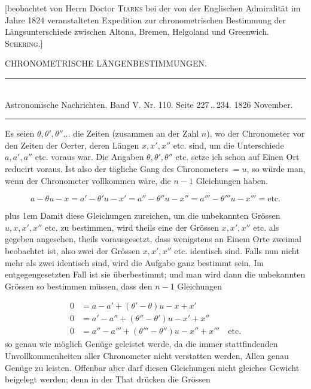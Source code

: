 \clearpage
{}
\hypertarget{native-460-chronometric}{}
\expandafter\def\csname HistoricalNoteText462\endcsname{[beobachtet von Herrn Doctor \textsc{Tiarks} bei der von der Englischen Admiralität im Jahre 1824
veranstalteten Expedition zur chronometrischen Bestimmung der Längsunterschiede zwischen Altona,
Bremen, Helgoland und Greenwich. \textsc{Schering}.]}
\begin{center}{\large CHRONOMETRISCHE LÄNGENBESTIMMUNGEN.}\end{center}

\begin{center}
\rule{0.55\linewidth}{0.4pt}\\[2pt]
Astronomische Nachrichten. Band V. Nr. 110. Seite 227\,..\,234. 1826 November.\\[2pt]
\rule{0.55\linewidth}{0.4pt}
\end{center}

Es seien $\theta, \theta', \theta''\ldots$ die Zeiten (zusammen an der Zahl $n$), wo der Chronometer
vor den Zeiten der Oerter, deren Längen $x, x', x''$ etc. sind, um die Unterschiede
$a, a', a''$ etc. voraus war. Die Angaben $\theta, \theta', \theta''$ etc. setze ich schon auf Einen Ort
reducirt voraus. Ist also der tägliche Gang des Chronometers $=u$, so würde man, wenn
der Chronometer vollkommen wäre, die $n-1$ Gleichungen haben.

\[
a-\theta u-x = a'-\theta' u-x' = a''-\theta'' u-x'' = a'''-\theta''' u-x''' = \text{etc.}
\]

\begingroup\rightskip=0pt plus 1em
Damit diese Gleichungen zureichen, um die unbekannten Grössen $u, x, x', x''$ etc. zu
bestimmen, wird theils eine der Grössen $x, x', x''$ etc. als gegeben angesehen, theils
vorausgesetzt, dass wenigstens an Einem Orte zweimal beobachtet ist, also zwei der
Grössen $x, x', x''$ etc. identisch sind. Falls nun nicht mehr als zwei identisch sind, wird
die Aufgabe ganz bestimmt sein. Im entgegengesetzten Fall ist sie überbestimmt; und man
wird dann die unbekannten Grössen so bestimmen müssen, dass den $n-1$ Gleichungen\par\endgroup

\[
\begin{aligned}
0 &= a-a'+(\theta'-\theta)u-x+x'\\
0 &= a'-a''+(\theta''-\theta')u-x'+x''\\
0 &= a''-a'''+(\theta'''-\theta'')u-x''+x''' \quad \text{etc.}
\end{aligned}
\]
\noindent so genau wie möglich Genüge geleistet werde, da die immer stattfindenden
Unvollkommenheiten aller Chronometer nicht verstatten werden, Allen genau Genüge zu
leisten. Offenbar aber darf diesen Gleichungen nicht gleiches Gewicht beigelegt werden;
denn in der That drücken die Grössen


